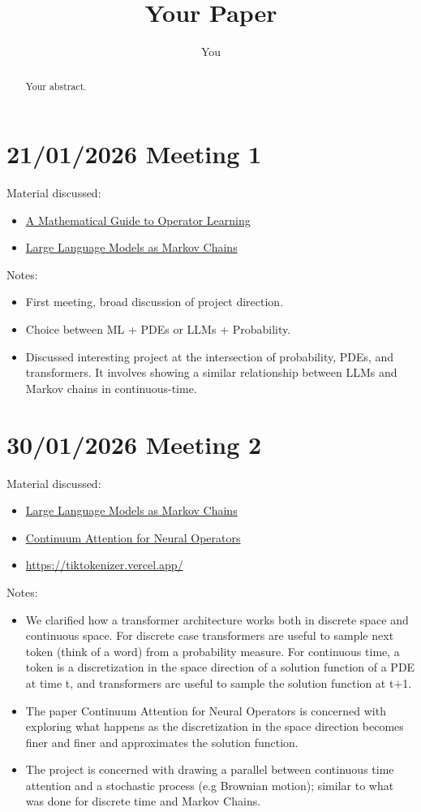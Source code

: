 \documentclass{article}
\title{Your Paper}
\author{You}
\begin{document}
\maketitle

\begin{abstract}
Your abstract.
\end{abstract}


\section{21/01/2026 Meeting 1}
Material discussed:
\begin{itemize}
    \item \href{https://arxiv.org/abs/2312.14688}{A Mathematical Guide to Operator Learning}
    \item \href{https://arxiv.org/abs/2410.02724}{Large Language Models as Markov Chains}
\end{itemize}
Notes:
\begin{itemize}
    \item First meeting, broad discussion of project direction.
    \item Choice between ML + PDEs or LLMs + Probability.
    \item Discussed interesting project at the intersection of probability, PDEs, and transformers. It involves showing a similar relationship between LLMs and Markov chains in continuous-time.
\end{itemize}

\section{30/01/2026 Meeting 2}
Material discussed:
\begin{itemize}
    \item \href{https://arxiv.org/abs/2410.02724}{Large Language Models as Markov Chains}
    \item \href{https://arxiv.org/abs/2406.06486}{Continuum Attention for Neural Operators}
    \item \url{https://tiktokenizer.vercel.app/}
\end{itemize}
Notes:
\begin{itemize}
    \item We clarified how a transformer architecture works both in discrete space and continuous space. For discrete case transformers are useful to sample next token (think of a word) from a probability measure.
    For continuous time, a token is a discretization in the space direction of a solution function of a PDE at time t, and transformers are useful to sample the solution function at t+1.
    \item The paper Continuum Attention for Neural Operators is concerned with exploring what happens as the discretization in the space direction becomes finer and finer and approximates the solution function.
    \item The project is concerned with drawing a parallel between continuous time attention and a stochastic process (e.g Brownian motion); similar to what was done for discrete time and Markov Chains.
\end{itemize}
\end{document}
